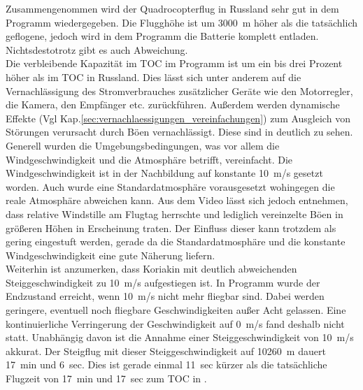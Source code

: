 Zusammengenommen wird der Quadrocopterflug in Russland sehr gut in dem Programm wiedergegeben. Die Flugghöhe ist um \SI{3000}{m} höher als die tatsächlich geflogene, jedoch wird in dem Programm die Batterie komplett entladen. Nichtsdestotrotz gibt es auch Abweichung.\\
Die verbleibende Kapazität im TOC im Programm ist um ein bis drei Prozent höher als im TOC in Russland. Dies lässt sich unter anderem auf die Vernachlässigung des Stromverbrauches zusätzlicher Geräte wie den Motorregler, die Kamera, den Empfänger etc. zurückführen. Außerdem werden dynamische Effekte (Vgl Kap.\ref{sec:vernachlaessigungen_vereinfachungen}) zum Ausgleich von Störungen verursacht durch Böen vernachlässigt. Diese sind in \cite{Anderson.2018} deutlich zu sehen. Generell wurden die Umgebungsbedingungen, was vor allem die Windgeschwindigkeit und die Atmosphäre betrifft, vereinfacht. Die Windgeschwindigkeit ist in der Nachbildung auf konstante \SI{10}{m/s} gesetzt worden. Auch wurde eine Standardatmosphäre vorausgesetzt wohingegen die reale Atmosphäre abweichen kann. Aus dem Video lässt sich jedoch entnehmen, dass relative Windstille am Flugtag herrschte und lediglich vereinzelte Böen in größeren Höhen in Erscheinung traten. Der Einfluss dieser kann trotzdem als gering eingestuft werden, gerade da die Standardatmosphäre und die konstante Windgeschwindigkeit eine gute Näherung liefern. \\
Weiterhin ist anzumerken, dass Koriakin mit deutlich abweichenden Steiggeschwindigkeit zu \SI{10}{m/s} aufgestiegen ist. In Programm wurde der Endzustand erreicht, wenn \SI{10}{m/s} nicht mehr fliegbar sind. Dabei werden geringere, eventuell noch fliegbare Geschwindigkeiten außer Acht gelassen. Eine kontinuierliche Verringerung der Geschwindigkeit auf \SI{0}{m/s} fand deshalb nicht statt. Unabhängig davon ist die Annahme einer Steiggeschwindigkeit von \SI{10}{m/s} akkurat. Der Steigflug mit dieser Steiggeschwindigkeit auf \SI{10260}{m} dauert \SI{17}{min} und \SI{6}{sec}. Dies ist gerade einmal \SI{11}{sec} kürzer als die tatsächliche Flugzeit von \SI{17}{min} und \SI{17}{sec} zum TOC in \cite{Anderson.2018}.\\
